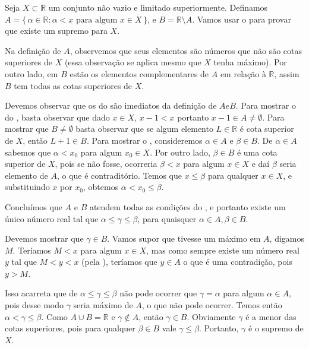\documentclass[../main.tex]{subfiles}
\begin{document}
\begin{dem}
    Seja $X \subset \mathbb{R}$ um conjunto não vazio e limitado superiormente. 
    Definamos $A = \{\, \alpha \in \mathbb{R} : \alpha < x \text{ para algum } x \in X \,\}$, e $B = \mathbb{R} \setminus A$.
    Vamos usar o  para provar que existe um supremo para $X$.

    Na definição de $A$, observemos que seus elementos são números que não são cotas superiores de $X$ (essa observação se aplica mesmo que $X$ tenha máximo). Por outro lado, em $B$ estão os elementos complementares de $A$ em relação à $\mathbb{R}$, assim $B$ tem todas as cotas superiores de $X$.

    Devemos observar que os  do  são imediatos da definição de $A e B$.
    Para mostrar o  do , basta observar que dado $x \in X$, $x-1 < x$ portanto $x-1 \in A \neq \emptyset$.
    Para mostrar que $B \neq \emptyset$ basta observar que se algum elemento $L \in \mathbb{R}$ é cota superior de $X$, então $L + 1 \in B$.
    Para mostrar o , consideremos $\alpha \in A$ e $\beta \in B$. De $\alpha \in A$ sabemos que $\alpha < x_0$ para algum $x_0 \in X$. Por outro lado, $\beta \in B$ é uma cota superior de $X$, pois se não fosse, ocorreria $\beta < x$ para algum $x \in X$ e daí $\beta$ seria elemento de $A$, o que é contraditório. Temos que $x \leq \beta$ para qualquer $x \in X$, e substituindo $x$ por $x_0$, obtemos $\alpha < x_0 \leq \beta$.

    Concluímos que $A$ e $B$ atendem todas as condições do , e portanto existe um único número real tal que 
    $\alpha \leq \gamma \leq \beta$, para quaisquer $\alpha \in A, \beta \in B$.

    Devemos mostrar que $\gamma \in B$. Vamos supor que tivesse um máximo em $A$, digamos $M$. Teríamos $M < x$ para algum $x \in X$, mas como sempre existe um número real $y$ tal que $M < y < x$ (pela ), teríamos que $y \in A$ o que é uma contradição, pois $y > M$.

    Isso acarreta que de $\alpha \leq \gamma \leq \beta$ não pode ocorrer que $\gamma = \alpha$ para algum $\alpha \in A$, pois desse modo $\gamma$ seria máximo de $A$, o que não pode ocorrer. Temos então $\alpha < \gamma \leq \beta$. Como $A \cup B = \mathbb{R}$ e $\gamma \not\in A$, então 
    $\gamma \in B$. Obviamente $\gamma$ é a menor das cotas superiores, pois para qualquer $\beta \in B$ vale $\gamma \leq \beta$. Portanto, $\gamma$ é o supremo de $X$.
\end{dem}
\end{document}
